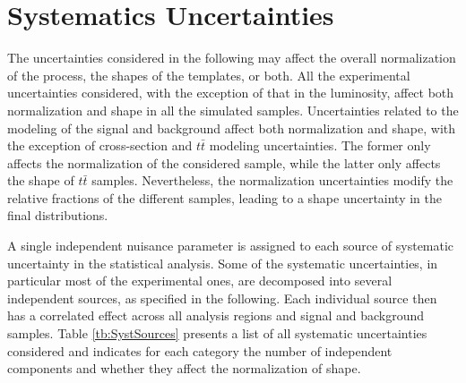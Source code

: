 \section{Systematics Uncertainties}
\label{sec:SystUncert}

The uncertainties considered in the following may affect the overall normalization of the process, the shapes of the templates, or both. All the experimental uncertainties considered, with the exception of that in the luminosity, affect both normalization and shape in all the simulated samples. Uncertainties related to the modeling of the signal and background affect both normalization and shape, with the exception of cross-section and $t\bar{t}$ modeling uncertainties. The former only affects the normalization of the considered sample, while the latter only affects the shape of $t\bar{t}$ samples. Nevertheless, the normalization uncertainties modify the relative fractions of the different samples, leading to a shape uncertainty in the final distributions.

A single independent nuisance parameter is assigned to each source of systematic uncertainty in the statistical analysis. Some of the systematic uncertainties, in particular most of the experimental ones, are decomposed into several independent sources, as specified in the following. Each individual source then has a correlated effect across all analysis regions and signal and background samples. Table \ref{tb:SystSources} presents a list of all systematic uncertainties considered and indicates for each category the number of independent components and whether they affect the normalization of shape.

